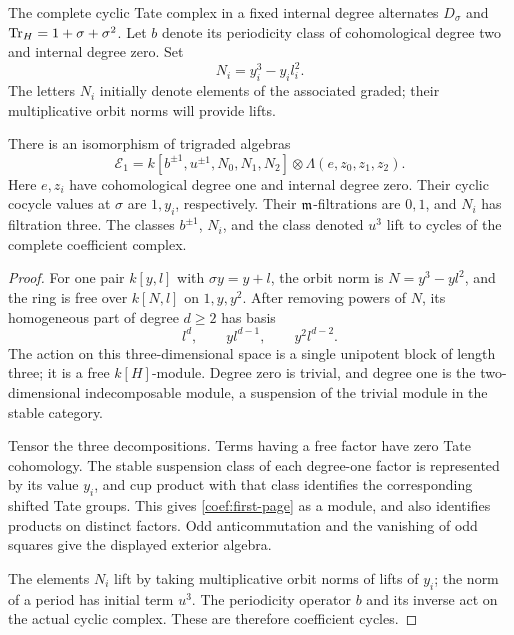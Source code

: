 The complete cyclic Tate complex in a fixed internal degree alternates
\(D_\sigma\) and \(\operatorname{Tr}_H=1+\sigma+\sigma^2\).  Let \(b\) denote its
periodicity class of cohomological degree two and internal degree zero.
Set
\[
 N_i=y_i^3-y_i l_i^2.
\]
The letters \(N_i\) initially denote elements of the associated graded;
their multiplicative orbit norms will provide lifts.

\begin{lemma}\label{coef:graded-tate}
There is an isomorphism of trigraded algebras
\begin{equation}\label{coef:first-page}
 \mathcal E_1
 =k[b^{\pm1},u^{\pm1},N_0,N_1,N_2]
       \otimes\Lambda(e,z_0,z_1,z_2).
\end{equation}
Here \(e,z_i\) have cohomological degree one and internal degree zero.
Their cyclic cocycle values at \(\sigma\) are \(1,y_i\), respectively.
Their \(\mathfrak m\)-filtrations are \(0,1\), and \(N_i\) has filtration three.
The classes \(b^{\pm1}\), \(N_i\), and the class denoted \(u^3\) lift
to cycles of the complete coefficient complex.
\end{lemma}

\begin{proof}
For one pair \(k[y,l]\) with \(\sigma y=y+l\), the orbit norm is
\(N=y^3-yl^2\), and the ring is free over \(k[N,l]\) on \(1,y,y^2\).
After removing powers of \(N\), its homogeneous part of degree \(d\ge2\)
has basis
\[
 l^d,\qquad yl^{d-1},\qquad y^2l^{d-2}.
\]
The action on this three-dimensional space is a single unipotent block
of length three; it is a free \(k[H]\)-module.  Degree zero is trivial,
and degree one is the two-dimensional indecomposable module, a
suspension of the trivial module in the stable category.

Tensor the three decompositions.  Terms having a free factor have zero
Tate cohomology.  The stable suspension class of each degree-one factor
is represented by its value \(y_i\), and cup product with that class
identifies the corresponding shifted Tate groups.  This gives
\eqref{coef:first-page} as a module, and also identifies products on
distinct factors.  Odd anticommutation and the vanishing of odd
squares give the displayed exterior algebra.

The elements \(N_i\) lift by taking multiplicative orbit norms of
lifts of \(y_i\); the norm of a period has initial term \(u^3\).
The periodicity operator \(b\) and its inverse act on the actual cyclic
complex.  These are therefore coefficient cycles.
\end{proof}

